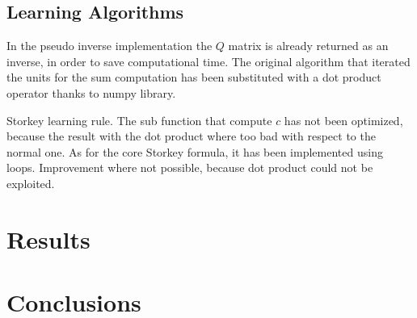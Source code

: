\documentclass[letterpaper,twocolumn,10pt]{article}
\begin{document}
\subsection{Learning Algorithms}

In the pseudo inverse implementation the $Q$ matrix is already returned as an inverse, in order to save computational time. The original algorithm that iterated the units for the sum computation has been substituted with a dot product operator thanks to numpy library.

Storkey learning rule. The sub function that compute $c$ has not been optimized, because the result with the dot product where too bad with respect to the normal one. As for the core Storkey formula, it has been implemented using loops. Improvement where not possible, because dot product could not be exploited.

\section{Results}


\section{Conclusions}







\vfill
\break


\onecolumn
\appendix
\label{app:appendixA}
\lstset{basicstyle=\small,style=myCustomMatlabStyle}
\end{document}
